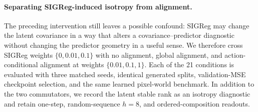 \documentclass{article}
\begin{document}
\paragraph{Separating SIGReg-induced isotropy from alignment.}
The preceding intervention still leaves a possible confound: SIGReg may change
the latent covariance in a way that alters a covariance--predictor diagnostic
without changing the predictor geometry in a useful sense. We therefore cross
SIGReg weights $\{0,0.01,0.1\}$ with no alignment, global alignment, and
action-conditional alignment at weights $\{0.01,0.1,1\}$. Each of the 21
conditions is evaluated with three matched seeds, identical generated splits,
validation-MSE checkpoint selection, and the same learned pixel-world
benchmark. In addition to the two commutators, we record the latent stable rank
as an isotropy diagnostic and retain one-step, random-sequence $h=8$, and
ordered-composition readouts.
\end{document}
